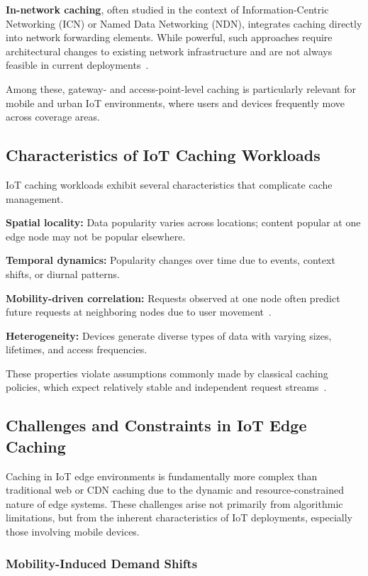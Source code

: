 \textbf{In-network caching}, often studied in the context of Information-Centric Networking (ICN) or Named Data Networking (NDN), integrates caching directly into network forwarding elements. While powerful, such approaches require architectural changes to existing network infrastructure and are not always feasible in current deployments~\cite{Zhang2014NDN}.

Among these, gateway- and access-point-level caching is particularly relevant for mobile and urban IoT environments, where users and devices frequently move across coverage areas.

\subsection{Characteristics of IoT Caching Workloads}

IoT caching workloads exhibit several characteristics that complicate cache management.

\textbf{Spatial locality:} Data popularity varies across locations; content popular at one edge node may not be popular elsewhere.

\textbf{Temporal dynamics:} Popularity changes over time due to events, context shifts, or diurnal patterns.

\textbf{Mobility-driven correlation:} Requests observed at one node often predict future requests at neighboring nodes due to user movement~\cite{Kotz2004Dartmouth}.

\textbf{Heterogeneity:} Devices generate diverse types of data with varying sizes, lifetimes, and access frequencies.

These properties violate assumptions commonly made by classical caching policies, which expect relatively stable and independent request streams~\cite{Podlipnig2003}.

\subsection{Challenges and Constraints in IoT Edge Caching}

Caching in IoT edge environments is fundamentally more complex than traditional web or CDN caching due to the dynamic and resource-constrained nature of edge systems. These challenges arise not primarily from algorithmic limitations, but from the inherent characteristics of IoT deployments, especially those involving mobile devices.

\subsubsection{Mobility-Induced Demand Shifts}


